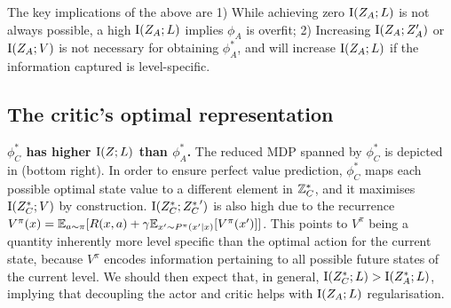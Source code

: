 
The key implications of the above are 1) While achieving zero $\text{I}(Z_A;L)$ is not always possible, a high $\text{I}(Z_A;L)$ implies $\phi_A$ is overfit; 2) Increasing $\text{I}(Z_A;Z_A')$ or $\text{I}(Z_A;V)$ is not necessary for obtaining $\phi^*_A$, and will increase $\text{I}(Z_A;L)$ if the information captured is level-specific.
%
\subsection{The critic's optimal representation}\label{c2:sec:optimal-c}
\textbf{$\phi^*_C$ has higher $\text{I}(Z;L)$ than $\phi^*_A$.} The reduced MDP spanned by $\phi^*_C$ is depicted in  (bottom right). In order to ensure perfect value prediction, $\phi^*_C$ maps each possible optimal state value to a different element in ${{\mathbb{Z}}^*_C}$, and it maximises $\text{I}({Z^*_C};V)$ by construction. $\text{I}({Z^*_C};{Z^*_C}')$ is also high due to the recurrence $V^\pi(x) = \mathbb{E}_{a\sim\pi} [R(x,a) + \gamma \mathbb{E}_{x'\sim P^\pi(x'|x)} [V^\pi(x')]]$. This points to $V^\pi$ being a quantity inherently more level specific than the optimal action for the current state, because $V^\pi$ encodes information pertaining to all possible future states of the current level. We should then expect that, in general, $\text{I}({Z^*_C};L) > \text{I}({Z^*_A};L)$, implying that decoupling the actor and critic helps with $\text{I}(Z_A;L)$ regularisation.%


